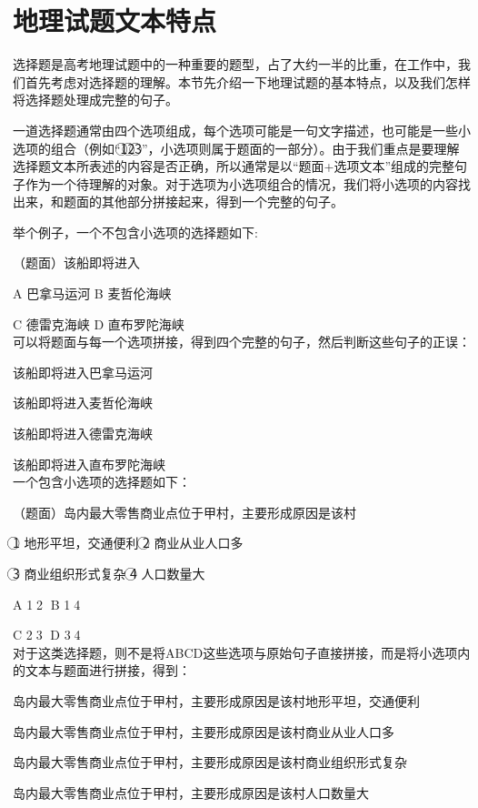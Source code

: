 \documentclass[master, winfont]{njuthesis}
\begin{document}
\section{地理试题文本特点}
选择题是高考地理试题中的一种重要的题型，占了大约一半的比重，在工作中，我们首先考虑对选择题的理解。本节先介绍一下地理试题的基本特点，以及我们怎样将选择题处理成完整的句子。

一道选择题通常由四个选项组成，每个选项可能是一句文字描述，也可能是一些小选项的组合（例如“\textcircled{1}\textcircled{2}\textcircled{3}”，小选项则属于题面的一部分）。由于我们重点是要理解选择题文本所表述的内容是否正确，所以通常是以“题面+选项文本”组成的完整句子作为一个待理解的对象。对于选项为小选项组合的情况，我们将小选项的内容找出来，和题面的其他部分拼接起来，得到一个完整的句子。

举个例子，一个不包含小选项的选择题如下:\par
（题面）该船即将进入\par
A 巴拿马运河   B 麦哲伦海峡\par
C 德雷克海峡   D 直布罗陀海峡\\


可以将题面与每一个选项拼接，得到四个完整的句子，然后判断这些句子的正误：\par
该船即将进入巴拿马运河\par
该船即将进入麦哲伦海峡\par
该船即将进入德雷克海峡\par
该船即将进入直布罗陀海峡\\

一个包含小选项的选择题如下：\par
（题面）岛内最大零售商业点位于甲村，主要形成原因是该村 \par
\textcircled{1} 地形平坦，交通便利   \textcircled{2} 商业从业人口多\par
\textcircled{3} 商业组织形式复杂     \textcircled{4} 人口数量大  \par
A \textcircled{1}\textcircled{2}  B \textcircled{1}\textcircled{4}\par
C \textcircled{2}\textcircled{3}  D \textcircled{3}\textcircled{4}\\

对于这类选择题，则不是将ABCD这些选项与原始句子直接拼接，而是将小选项内的文本与题面进行拼接，得到：\par
岛内最大零售商业点位于甲村，主要形成原因是该村地形平坦，交通便利\par
岛内最大零售商业点位于甲村，主要形成原因是该村商业从业人口多\par
岛内最大零售商业点位于甲村，主要形成原因是该村商业组织形式复杂\par
岛内最大零售商业点位于甲村，主要形成原因是该村人口数量大\\
\end{document}
